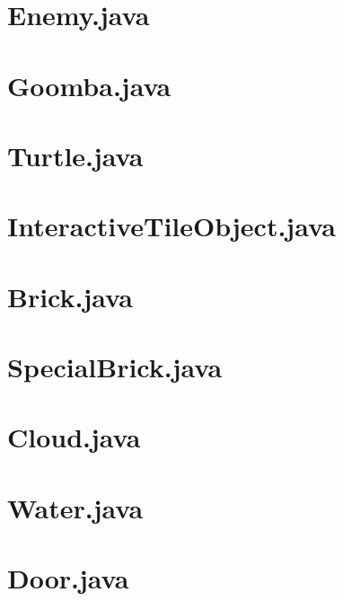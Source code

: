 \documentclass{article}
\begin{document}
	\section*{Enemy.java}
	
	\newpage
	
	\section*{Goomba.java}
	
	\newpage
	
	\section*{Turtle.java}
	
	\newpage
	
	\section*{InteractiveTileObject.java}
	
	\newpage
	
	\section*{Brick.java}
	
	\newpage
	
	\section*{SpecialBrick.java}
	
	\newpage
	
	\section*{Cloud.java}
	
	\newpage
	
	\section*{Water.java}
	
	\newpage
	
	\section*{Door.java}
	
	\newpage
	
\end{document}
